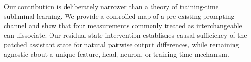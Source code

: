 Our contribution is deliberately narrower than a theory of training-time
subliminal learning. We provide a controlled map of a pre-existing prompting
channel and show that four measurements commonly treated as interchangeable can
dissociate. Our residual-state intervention establishes causal sufficiency of
the patched assistant state for natural pairwise output differences, while
remaining agnostic about a unique feature, head, neuron, or training-time
mechanism.
